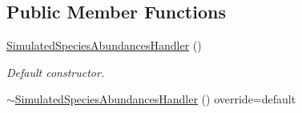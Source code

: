 \subsection*{Public Member Functions}
\begin{DoxyCompactItemize}
\item 
\hyperlink{class_simulated_species_abundances_handler_a619b31a1882c952b3755b59ffce612b7}{Simulated\+Species\+Abundances\+Handler} ()\hypertarget{class_simulated_species_abundances_handler_a619b31a1882c952b3755b59ffce612b7}{}\label{class_simulated_species_abundances_handler_a619b31a1882c952b3755b59ffce612b7}

\begin{DoxyCompactList}\small\item\em Default constructor. \end{DoxyCompactList}\item 
\hyperlink{class_simulated_species_abundances_handler_a14860439812af17861f35b06043d2e45}{$\sim$\+Simulated\+Species\+Abundances\+Handler} () override=default\hypertarget{class_simulated_species_abundances_handler_a14860439812af17861f35b06043d2e45}{}\label{class_simulated_species_abundances_handler_a14860439812af17861f35b06043d2e45}


\end{DoxyCompactItemize}
